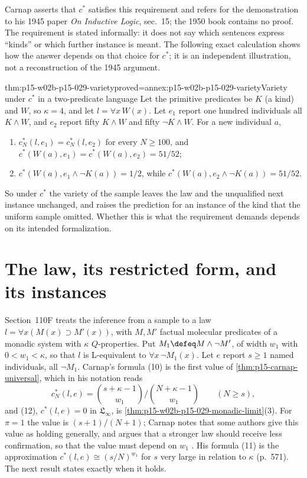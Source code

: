 Carnap asserts that \(c^*\) satisfies this requirement and refers for
the demonstration to his 1945 paper \emph{On Inductive Logic}, sec.~15;
the 1950 book contains no proof. The requirement is stated informally:
it does not say which sentences express ``kinds'' or which further
instance is meant. The following exact calculation shows how the answer
depends on that choice for \(c^*\); it is an independent illustration,
not a reconstruction of the 1945 argument.

\begin{hbtheorem}{thm:p15-w02b-p15-029-variety}{proved=annex:p15-w02b-p15-029-variety}{Variety under \(c^*\) in a two-predicate language}
Let the primitive predicates be \(K\) (a kind) and \(W\), so
\(\kappa=4\), and let \(l=\forall x\,W(x)\). Let \(e_1\) report one
hundred individuals all \(K\land W\), and \(e_2\) report fifty
\(K\land W\) and fifty \(\neg K\land W\). For a new individual \(a\),
\begin{enumerate}
 \item \(c^*_N(l,e_1)=c^*_N(l,e_2)\) for every \(N\geq100\), and
       \(c^*(W(a),e_1)=c^*(W(a),e_2)=51/52\);
 \item \(c^*(W(a),e_1\land\neg K(a))=1/2\), while
       \(c^*(W(a),e_2\land\neg K(a))=51/52\).
\end{enumerate}
\end{hbtheorem}

So under \(c^*\) the variety of the sample leaves the law and the
unqualified next instance unchanged, and raises the prediction for an
instance of the kind that the uniform sample omitted. Whether this is
what the requirement demands depends on its intended formalization.

\section{The law, its restricted form, and its instances}
\label{sec:p15-w02b-p15-029-laws}

Section~110F treats the inference from a sample to a law
\(l=\forall x(M(x)\supset M'(x))\), with \(M,M'\) factual molecular
predicates of a monadic system with \(\kappa\) \(Q\)-properties. Put
\(M_1\defeq M\land\neg M'\), of width \(w_1\) with \(0<w_1<\kappa\),
so that \(l\) is L-equivalent to \(\forall x\,\neg M_1(x)\). Let \(e\)
report \(s\geq1\) named individuals, all \(\neg M_1\). Carnap's
formula (10) is the first value of \cref{thm:p15-carnap-universal},
which in his notation reads
\[
 c^*_N(l,e)=\binom{s+\kappa-1}{w_1}\Big/\binom{N+\kappa-1}{w_1}
 \qquad(N\geq s),
\]
and (12), \(c^*(l,e)=0\) in \(\mathfrak L_\infty\), is
\cref{thm:p15-w02b-p15-029-monadic-limit}(3). For
\(\pi=1\) the value is \((s+1)/(N+1)\); Carnap notes that some
authors give this value as holding generally, and argues that a
stronger law should receive less confirmation, so that the value must
depend on \(w_1\) \cite[sec.~110F, pp.~570--571]{Carnap1950Probability}.
His formula (11) is the approximation
\(c^*(l,e)\cong(s/N)^{w_1}\) for \(s\) very large in relation to
\(\kappa\) (p.~571). The next result states exactly when it holds.

